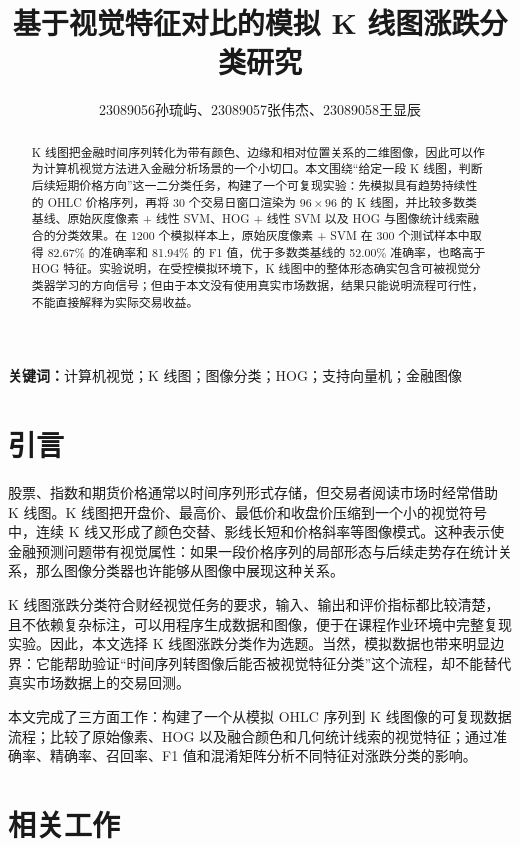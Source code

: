 \documentclass[UTF8,a4paper,11pt,fontset=fandol]{ctexart}
\title{\heiti 基于视觉特征对比的模拟 K 线图涨跌分类研究}
\author{23089056孙琉屿、23089057张伟杰、23089058王显辰}
\date{}
\begin{document}
\maketitle

\begin{abstract}
K 线图把金融时间序列转化为带有颜色、边缘和相对位置关系的二维图像，因此可以作为计算机视觉方法进入金融分析场景的一个小切口。本文围绕“给定一段 K 线图，判断后续短期价格方向”这一二分类任务，构建了一个可复现实验：先模拟具有趋势持续性的 OHLC 价格序列，再将 30 个交易日窗口渲染为 $96\times96$ 的 K 线图，并比较多数类基线、原始灰度像素 + 线性 SVM、HOG + 线性 SVM 以及 HOG 与图像统计线索融合的分类效果。在 1200 个模拟样本上，原始灰度像素 + SVM 在 300 个测试样本中取得 82.67\% 的准确率和 81.94\% 的 F1 值，优于多数类基线的 52.00\% 准确率，也略高于 HOG 特征。实验说明，在受控模拟环境下，K 线图中的整体形态确实包含可被视觉分类器学习的方向信号；但由于本文没有使用真实市场数据，结果只能说明流程可行性，不能直接解释为实际交易收益。
\end{abstract}

\noindent\textbf{关键词：}计算机视觉；K 线图；图像分类；HOG；支持向量机；金融图像

\section{引言}

股票、指数和期货价格通常以时间序列形式存储，但交易者阅读市场时经常借助 K 线图。K 线图把开盘价、最高价、最低价和收盘价压缩到一个小的视觉符号中，连续 K 线又形成了颜色交替、影线长短和价格斜率等图像模式。这种表示使金融预测问题带有视觉属性：如果一段价格序列的局部形态与后续走势存在统计关系，那么图像分类器也许能够从图像中展现这种关系。

K 线图涨跌分类符合财经视觉任务的要求，输入、输出和评价指标都比较清楚，且不依赖复杂标注，可以用程序生成数据和图像，便于在课程作业环境中完整复现实验。因此，本文选择 K 线图涨跌分类作为选题。当然，模拟数据也带来明显边界：它能帮助验证“时间序列转图像后能否被视觉特征分类”这个流程，却不能替代真实市场数据上的交易回测。

本文完成了三方面工作：构建了一个从模拟 OHLC 序列到 K 线图像的可复现数据流程；比较了原始像素、HOG 以及融合颜色和几何统计线索的视觉特征；通过准确率、精确率、召回率、F1 值和混淆矩阵分析不同特征对涨跌分类的影响。

\section{相关工作}
\end{document}
